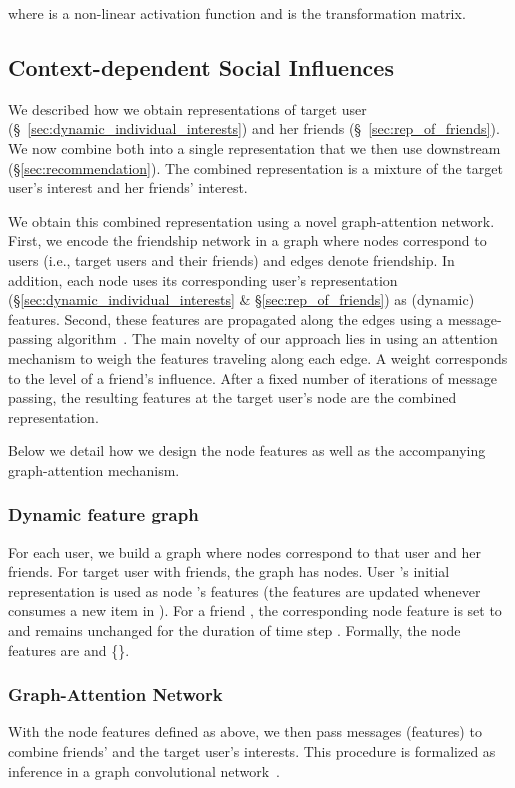 \documentclass[sigconf]{acmart}
\begin{document}
where  is a non-linear activation function and  is the transformation matrix.

\subsection{Context-dependent Social Influences}\label{sec:context_dependent_social_influences}
We described how we obtain representations of target user (\S~\ref{sec:dynamic_individual_interests}) and her friends (\S~\ref{sec:rep_of_friends}). We now combine both into a single representation that we then use downstream (\S \ref{sec:recommendation}). The combined representation is a mixture of the target user's interest and her friends' interest. 

We obtain this combined representation using a novel graph-attention network. 
First, we encode the friendship network in a graph where nodes correspond to users (i.e., target users and their friends) and edges denote friendship. In addition, each node uses its corresponding user's representation (\S \ref{sec:dynamic_individual_interests} \& \S\ref{sec:rep_of_friends}) as (dynamic) features. Second, these features are propagated along the edges using a message-passing algorithm~\cite{gilmer2017neural}. The main novelty of our approach lies in using an attention mechanism to weigh the features traveling along each edge. A weight corresponds to the level of a friend's influence. After a fixed number of iterations of message passing, the resulting features at the target user's node are the combined representation. 

Below we detail how we design the node features as well as the accompanying graph-attention mechanism. 


\subsubsection{Dynamic feature graph}
For each user, we build a graph where nodes correspond to that user and her friends. For target user  with  friends, the graph has  nodes. User 's initial representation  is used as node 's features  (the features are updated whenever  consumes a new item in ).
For a friend , the corresponding node feature is set to  and remains unchanged for the duration of time step . Formally, the node features are  and \{\}.


\subsubsection{Graph-Attention Network} With the node features defined as above, we then pass messages (features) to combine friends' and the target user's interests. This procedure is formalized as inference in a graph convolutional network~\cite{kipf2016semi}. 
\end{document}
